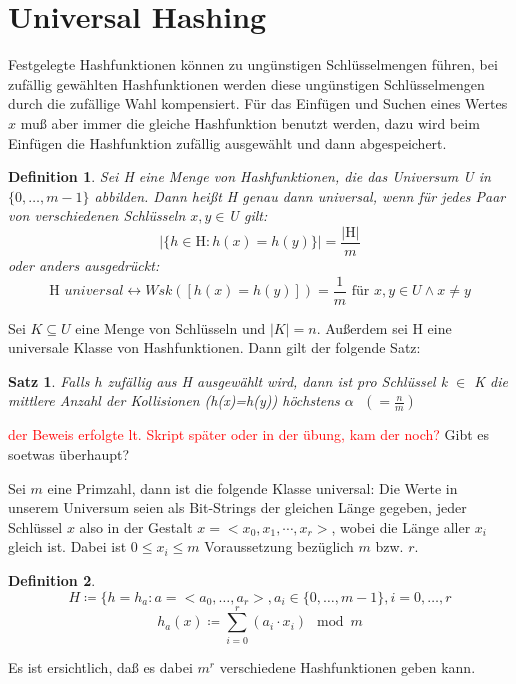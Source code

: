 \documentclass[ngerman,draft,parskip=half*,twoside]{scrreprt}
\theoremstyle{break}
\newtheorem{satz}{Satz}[chapter]
\newtheorem{definition}{Definition}[chapter]
\theoremstyle{nonumberbreak}
\begin{document}
\section{Universal Hashing}
Festgelegte Hashfunktionen können zu ungünstigen Schlüsselmengen führen, bei zufällig gewählten Hashfunktionen
werden diese ungünstigen Schlüsselmengen durch die zufällige Wahl kompensiert. Für das Einfügen und Suchen eines Wertes
$x$ muß aber immer die gleiche Hashfunktion benutzt werden, dazu wird beim Einfügen die Hashfunktion zufällig
ausgewählt und dann abgespeichert.

\begin{definition}
Sei H eine Menge von Hashfunktionen, die das Universum U in $\{0, \ldots, m-1\}$ abbilden. Dann heißt H genau dann
universal, wenn für jedes Paar von verschiedenen Schlüsseln $x, y \in $U gilt:
\[\vert\{h \in \mbox{H} : h(x)=h(y)\}\vert=\frac{\vert \mbox{H}\vert}{m}\]
oder anders ausgedrückt:
\[\mbox{H }universal \leftrightarrow Wsk([h(x)=h(y)])=\frac{1}{m}
\mbox{ für }x,  y \in U \wedge x\neq y\]
\end{definition}

Sei $K \subseteq U$ eine Menge von Schlüsseln und $\vert K\vert =n$. Außerdem sei H eine universale Klasse von
Hashfunktionen. Dann gilt der folgende Satz:
\begin{satz}
Falls $h$ zufällig aus H ausgewählt wird, dann ist pro Schlüssel k $\in$ K die mittlere Anzahl der Kollisionen
(h(x)=h(y)) höchstens $\alpha \mbox{ } (=\frac{n}{m})$
\end{satz}
\textcolor{red}{der Beweis erfolgte lt. Skript später oder in der übung, kam der noch?}
Gibt es soetwas überhaupt?

Sei $m$ eine Primzahl, dann ist die folgende Klasse universal:
Die Werte in unserem Universum seien als Bit-Strings der gleichen Länge gegeben, jeder Schlüssel $x$ also in der
Gestalt $x=<x_0, x_1, \cdots, x_r>$, wobei die Länge aller $x_i$ gleich ist.  Dabei ist $0\leq x_i\leq m$ Voraussetzung
bezüglich $m$ bzw. $r$.
\begin{definition}
\[H\coloneqq \{h=h_a : a=<a_0, \ldots, a_r>, a_i \in \{0, \ldots, m-1\}, i=0, \ldots, r\]
\[h_a(x)\coloneqq \sum_{i=0}^r (a_i \cdot x_i) \mod m\]
\end{definition}
Es ist ersichtlich, daß es dabei $m^r$ verschiedene Hashfunktionen geben kann.
\end{document}

